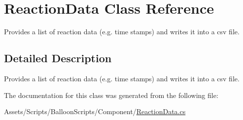 \hypertarget{classReactionData}{}\section{Reaction\+Data Class Reference}
\label{classReactionData}


Provides a list of reaction data (e.\+g. time stamps) and writes it into a csv file.  




\subsection{Detailed Description}
Provides a list of reaction data (e.\+g. time stamps) and writes it into a csv file. 



The documentation for this class was generated from the following file\+:\begin{DoxyCompactItemize}
\item 
Assets/\+Scripts/\+Balloon\+Scripts/\+Component/\hyperlink{ReactionData_8cs}{Reaction\+Data.\+cs}\end{DoxyCompactItemize}
